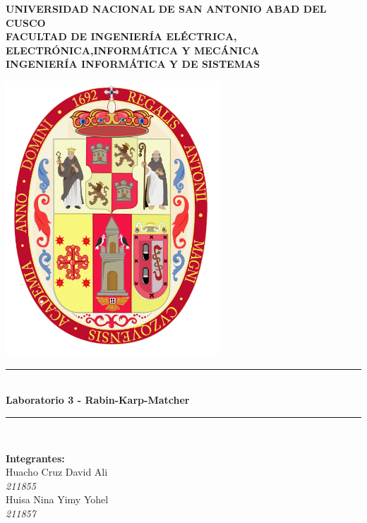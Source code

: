 \documentclass[a4paper]{article}
\begin{document}
\begin{titlepage}

\newcommand{\linea}{\rule{\linewidth}{0.7mm}} 
\center
\textbf{\Large UNIVERSIDAD NACIONAL DE SAN ANTONIO ABAD DEL CUSCO}\\[0.2cm]
\textbf{\Large FACULTAD DE INGENIERÍA ELÉCTRICA, ELECTRÓNICA,INFORMÁTICA Y MECÁNICA}\\[0.2cm]
\textbf{\Large INGENIERÍA INFORMÁTICA Y DE SISTEMAS\\[0.6cm]}

\includegraphics[width=8cm]{escudo-unsaac.png}
\vfill

\linea
\\[0.3cm]
\textbf{\LARGE Laboratorio 3 - Rabin-Karp-Matcher}\\[0.2cm]
\linea \\
\vfill

\textbf{\Large Integrantes:}\\[0.2cm]
    {\large Huacho Cruz David Ali }\\
    \textit{211855}\\[0.1cm]

    {\large Huisa Nina Yimy Yohel }\\
    \textit{211857}\\[0.1cm]


\end{titlepage}
\end{document}
